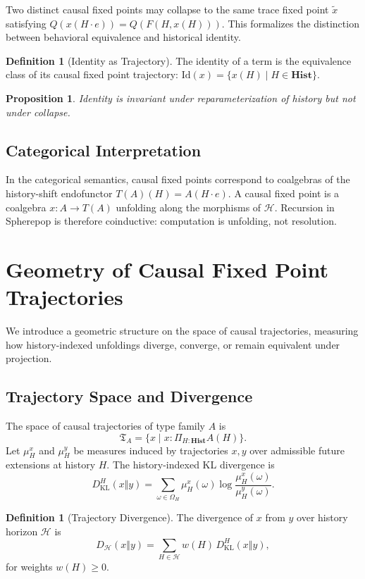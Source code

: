 \documentclass[11pt,a4paper]{article}
\newtheorem{proposition}[theorem]{Proposition}
\theoremstyle{definition}
\newtheorem{definition}[theorem]{Definition}
\theoremstyle{remark}
\begin{document}
Two distinct causal fixed points may collapse to the same trace fixed point $\tilde{x}$ satisfying $Q(x(H \cdot e)) = Q(F(H, x(H)))$. This formalizes the distinction between behavioral equivalence and historical identity.

\begin{definition}[Identity as Trajectory]
The identity of a term is the equivalence class of its causal fixed point trajectory: $\mathrm{Id}(x) = \{x(H) \mid H \in \mathbf{Hist}\}$.
\end{definition}

\begin{proposition}
Identity is invariant under reparameterization of history but not under collapse.
\end{proposition}

\subsection{Categorical Interpretation}

In the categorical semantics, causal fixed points correspond to coalgebras of the history-shift endofunctor $T(A)(H) = A(H \cdot e)$. A causal fixed point is a coalgebra $x : A \to T(A)$ unfolding along the morphisms of $\mathcal{H}$. Recursion in Spherepop is therefore coinductive: computation is unfolding, not resolution.

\section{Geometry of Causal Fixed Point Trajectories}

We introduce a geometric structure on the space of causal trajectories, measuring how history-indexed unfoldings diverge, converge, or remain equivalent under projection.

\subsection{Trajectory Space and Divergence}

The space of causal trajectories of type family $A$ is
\[
\mathfrak{T}_A = \{x \mid x : \Pi_{H:\mathbf{Hist}} A(H)\}.
\]
Let $\mu_H^x$ and $\mu_H^y$ be measures induced by trajectories $x, y$ over admissible future extensions at history $H$. The history-indexed KL divergence is
\[
D_{\mathrm{KL}}^H(x \Vert y) = \sum_{\omega \in \Omega_H} \mu_H^x(\omega) \log \frac{\mu_H^x(\omega)}{\mu_H^y(\omega)}.
\]

\begin{definition}[Trajectory Divergence]
The divergence of $x$ from $y$ over history horizon $\mathcal{H}$ is
\[
D_{\mathcal{H}}(x \Vert y) = \sum_{H \in \mathcal{H}} w(H)\, D_{\mathrm{KL}}^H(x \Vert y),
\]
for weights $w(H) \geq 0$.
\end{definition}
\end{document}

